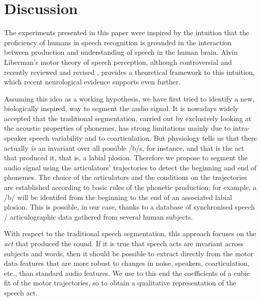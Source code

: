 \section{Discussion}
\label{sec:disc}

The experiments presented in this paper were inspired by the intuition that the
proficiency of humans in speech recognition is grounded in the interaction
between production and understanding of speech in the human brain. Alvin
Liberman's motor theory of speech perception, although controversial and
recently reviewed and revised \cite{liberman1,liberman2,galant,massaro},
provides a theoretical framework to this intuition, which recent neurological
evidence \cite{dausilio} supports even further.

Assuming this idea as a working hypothesis, we have first tried to identify
a new, biologically inspired, way to segment the audio signal.
 It is nowadays widely accepted that the traditional segmentation, carried out 
by exclusively looking at the acoustic properties of phonemes, has strong limitations
mainly due to intra-speaker speech variability and to coarticulation.  
But physiology tells us that there actually \emph{is} an invariant
over all possible /b/s, for instance, and that is the act that produced it,
that is, a labial plosion. Therefore we propose to segment the audio signal
using the articulators' trajectories to detect
the beginning and end of phonemes. The choice of the articulators and the
conditions on the trajectories are established according to basic rules of
the phonetic production; for example, a /b/ will be identifed from
the beginning to the end of an associated labial plosion. This is possible,
in our case, thanks to a database of synchronised speech / articulographic
data gathered from several human subjects.

With respect to the traditional speech segmentation, 
this approach focuses on the \emph{act} that produced the sound. If it is true that speech acts are invariant across
subjects and words, then it should be possible to extract directly from the motor data
features that are more robust to changes in noise, speakers,
coarticulation, etc., than standard
audio features. We use to this end the coefficients of a cubic fit of the
motor trajectories, so to obtain a qualitative representation of the speech
act.


